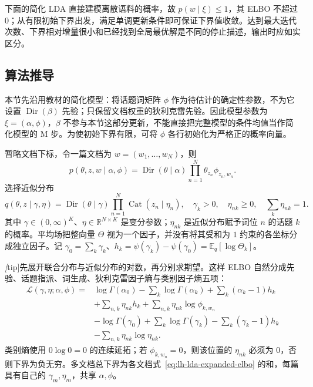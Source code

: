 下面的简化 LDA 直接建模离散语料的概率，故 $p(w\mid\xi)\leq1$，其 ELBO 不超过 $0$；从有限初始下界出发，满足单调更新条件即可保证下界值收敛。达到最大迭代次数、下界相对增量很小和已经找到全局最优解是不同的停止描述，输出时应如实区分。

\subsection{算法推导}
\label{subsec:lh-lda-variational-derivation}

本节先沿用教材的简化模型：将话题词矩阵 $\phi$ 作为待估计的确定性参数，不为它设置 $\operatorname{Dir}(\beta)$ 先验；只保留文档权重的狄利克雷先验。因此模型参数为 $\xi=(\alpha,\phi)$，$\beta$ 不参与本节这部分更新，不能直接把完整模型的条件均值当作简化模型的 M 步。为使初始下界有限，可将 $\phi$ 各行初始化为严格正的概率向量。

暂略文档下标，令一篇文档为 $w=(w_1,\ldots,w_N)$，则
\begin{equation}
p(\theta,z,w\mid\alpha,\phi)
=\operatorname{Dir}(\theta\mid\alpha)\prod_{n=1}^N\theta_{z_n}\phi_{z_n,w_n}.
\label{eq:lh-lda-simplified-joint}
\end{equation}
选择近似分布
\begin{equation}
q(\theta,z\mid\gamma,\eta)
=\operatorname{Dir}(\theta\mid\gamma)
\prod_{n=1}^N\operatorname{Cat}(z_n\mid\eta_n),
\quad\gamma_k>0,\quad\eta_{nk}\geq0,\quad\sum_k\eta_{nk}=1.
\label{eq:lh-lda-variational-family}
\end{equation}
其中 $\gamma\in(0,\infty)^K$、$\eta\in\mathbb R^{N\times K}$ 是变分参数；$\eta_{nk}$ 是近似分布赋予词位 $n$ 的话题 $k$ 的概率。平均场把整向量 $\Theta$ 视为一个因子，并没有将其受和为 $1$ 约束的各坐标分成独立因子。记 $\gamma_0=\sum_k\gamma_k$、$h_k=\psi(\gamma_k)-\psi(\gamma_0)=\mathbb E_q[\log\Theta_k]$。

\emph[tip]{先展开联合分布与近似分布的对数，再分别求期望。}这样 ELBO 自然分成先验、话题指派、词生成、狄利克雷因子熵与类别因子熵五项：
\begin{equation}
\begin{aligned}
\mathcal L(\gamma,\eta;\alpha,\phi)
={}&\log\Gamma(\alpha_0)-\sum_k\log\Gamma(\alpha_k)
+\sum_k(\alpha_k-1)h_k\\
&+\sum_{n,k}\eta_{nk}h_k
+\sum_{n,k}\eta_{nk}\log\phi_{k,w_n}\\
&-\log\Gamma(\gamma_0)+\sum_k\log\Gamma(\gamma_k)
-\sum_k(\gamma_k-1)h_k\\
&-\sum_{n,k}\eta_{nk}\log\eta_{nk}.
\end{aligned}
\label{eq:lh-lda-expanded-elbo}
\end{equation}
类别熵使用 $0\log0=0$ 的连续延拓；若 $\phi_{k,w_n}=0$，则该位置的 $\eta_{nk}$ 必须为 $0$，否则下界为负无穷。多文档总下界为各文档式~\eqref{eq:lh-lda-expanded-elbo} 的和，每篇具有自己的 $\gamma_m,\eta_m$，共享 $\alpha,\phi$。

